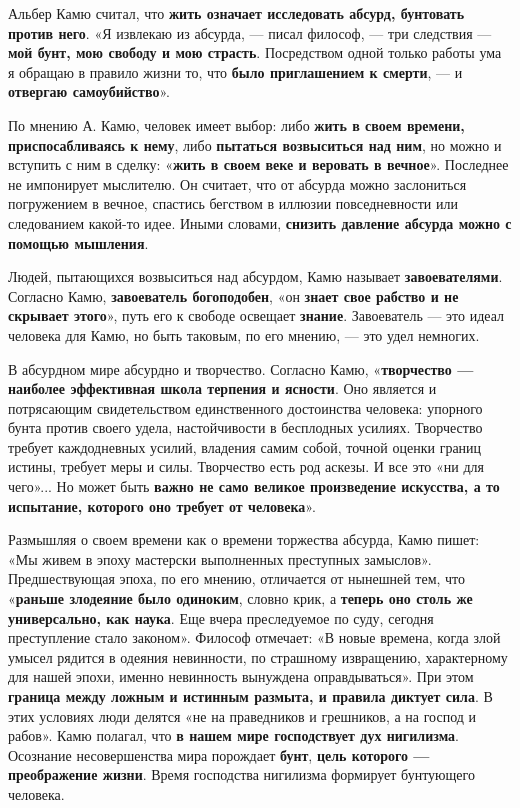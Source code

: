 \documentclass{article}
\begin{document}
\begin{flushleft}
\hfill

Альбер Камю считал, что \textbf{жить означает исследовать абсурд, бунтовать против него}. «Я извлекаю из абсурда, — писал философ, — три следствия — \textbf{мой бунт, мою свободу и мою страсть}. Посредством одной только работы ума я обращаю в правило жизни то, что \textbf{было приглашением к смерти}, — и \textbf{отвергаю самоубийство}».

\hfill

По мнению А. Камю, человек имеет выбор: либо \textbf{жить в своем времени, приспосабливаясь к нему}, либо \textbf{пытаться возвыситься над ним}, но можно и вступить с ним в сделку: «\textbf{жить в своем веке и веровать в вечное}». Последнее не импонирует мыслителю. Он считает, что от абсурда можно заслониться погружением в вечное, спастись бегством в иллюзии повседневности или следованием какой-то идее. Иными словами, \textbf{снизить давление абсурда можно с помощью мышления}.

\hfill

Людей, пытающихся возвыситься над абсурдом, Камю называет \textbf{завоевателями}. Согласно Камю, \textbf{завоеватель богоподобен}, «он \textbf{знает свое рабство и не скрывает этого}», путь его к свободе освещает \textbf{знание}. Завоеватель — это идеал человека для Камю, но быть таковым, по его мнению, — это удел немногих.

\hfill

В абсурдном мире абсурдно и творчество. Согласно Камю, «\textbf{творчество — наиболее эффективная школа терпения и ясности}. Оно является и потрясающим свидетельством единственного достоинства человека: упорного бунта против своего удела, настойчивости в бесплодных усилиях. Творчество требует каждодневных усилий, владения самим собой, точной оценки границ истины, требует меры и силы. Творчество есть род аскезы. И все это «ни для чего»... Но может быть \textbf{важно не само великое произведение искусства, а то испытание, которого оно требует от человека}».

\hfill

Размышляя о своем времени как о времени торжества абсурда, Камю пишет: «Мы живем в эпоху мастерски выполненных преступных замыслов». Предшествующая эпоха, по его мнению, отличается от нынешней тем, что «\textbf{раньше злодеяние было одиноким}, словно крик, а \textbf{теперь оно столь же универсально, как наука}. Еще вчера преследуемое по суду, сегодня преступление стало законом». Философ отмечает: «В новые времена, когда злой умысел рядится в одеяния невинности, по страшному извращению, характерному для нашей эпохи, именно невинность вынуждена оправдываться». При этом \textbf{граница между ложным и истинным размыта, и правила диктует сила}. В этих условиях люди делятся «не на праведников и грешников, а на господ и рабов». Камю полагал, что \textbf{в нашем мире господствует дух нигилизма}. Осознание несовершенства мира порождает \textbf{бунт}, \textbf{цель которого — преображение жизни}. Время господства нигилизма формирует бунтующего человека.


\end{flushleft}
\end{document}
